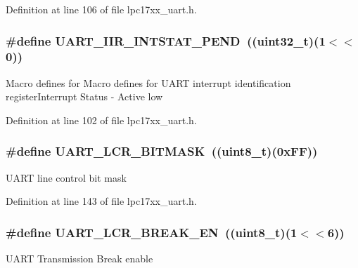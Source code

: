 \-Definition at line 106 of file lpc17xx\-\_\-uart.\-h.

\hypertarget{group___u_a_r_t___private___macros_gab5fadcd32fca709aece83c05f8be1901}{
\subsubsection[{\-U\-A\-R\-T\-\_\-\-I\-I\-R\-\_\-\-I\-N\-T\-S\-T\-A\-T\-\_\-\-P\-E\-N\-D}]{\setlength{\rightskip}{0pt plus 5cm}\#define {\bf \-U\-A\-R\-T\-\_\-\-I\-I\-R\-\_\-\-I\-N\-T\-S\-T\-A\-T\-\_\-\-P\-E\-N\-D}~((uint32\-\_\-t)(1$<$$<$0))}}\label{group___u_a_r_t___private___macros_gab5fadcd32fca709aece83c05f8be1901}
\-Macro defines for \-Macro defines for \-U\-A\-R\-T interrupt identification register\-Interrupt \-Status -\/ \-Active low 

\-Definition at line 102 of file lpc17xx\-\_\-uart.\-h.

\hypertarget{group___u_a_r_t___private___macros_ga28e31fe85eeeb124ff6a471978155356}{
\subsubsection[{\-U\-A\-R\-T\-\_\-\-L\-C\-R\-\_\-\-B\-I\-T\-M\-A\-S\-K}]{\setlength{\rightskip}{0pt plus 5cm}\#define {\bf \-U\-A\-R\-T\-\_\-\-L\-C\-R\-\_\-\-B\-I\-T\-M\-A\-S\-K}~((uint8\-\_\-t)(0x\-F\-F))}}\label{group___u_a_r_t___private___macros_ga28e31fe85eeeb124ff6a471978155356}
\-U\-A\-R\-T line control bit mask 

\-Definition at line 143 of file lpc17xx\-\_\-uart.\-h.

\hypertarget{group___u_a_r_t___private___macros_ga2f83aa82aecd63cf457ea423be643d57}{
\subsubsection[{\-U\-A\-R\-T\-\_\-\-L\-C\-R\-\_\-\-B\-R\-E\-A\-K\-\_\-\-E\-N}]{\setlength{\rightskip}{0pt plus 5cm}\#define {\bf \-U\-A\-R\-T\-\_\-\-L\-C\-R\-\_\-\-B\-R\-E\-A\-K\-\_\-\-E\-N}~((uint8\-\_\-t)(1$<$$<$6))}}\label{group___u_a_r_t___private___macros_ga2f83aa82aecd63cf457ea423be643d57}
\-U\-A\-R\-T \-Transmission \-Break enable 

